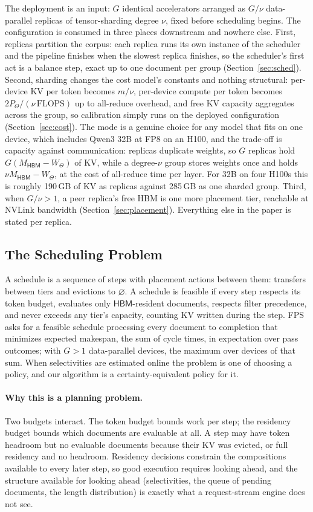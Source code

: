 \documentclass[10pt,twocolumn]{article}
\newcommand{\hbm}{\mathsf{HBM}}
\newcommand{\none}{\varnothing}
\begin{document}
The deployment is an input: $G$ identical accelerators arranged as $G/\nu$ data-parallel replicas of tensor-sharding degree $\nu$, fixed before scheduling begins. The configuration is consumed in three places downstream and nowhere else. First, replicas partition the corpus: each replica runs its own instance of the scheduler and the pipeline finishes when the slowest replica finishes, so the scheduler's first act is a balance step, exact up to one document per group (Section~\ref{sec:sched}). Second, sharding changes the cost model's constants and nothing structural: per-device KV per token becomes $m/\nu$, per-device compute per token becomes $2P_{\Theta}/(\nu\,\mathrm{FLOPS})$ up to all-reduce overhead, and free KV capacity aggregates across the group, so calibration simply runs on the deployed configuration (Section~\ref{sec:cost}). The mode is a genuine choice for any model that fits on one device, which includes Qwen3 32B at FP8 on an H100, and the trade-off is capacity against communication: replicas duplicate weights, so $G$ replicas hold $G(M_{\hbm} - W_{\Theta})$ of KV, while a degree-$\nu$ group stores weights once and holds $\nu M_{\hbm} - W_{\Theta}$, at the cost of all-reduce time per layer. For 32B on four H100s this is roughly 190\,GB of KV as replicas against 285\,GB as one sharded group. Third, when $G/\nu > 1$, a peer replica's free HBM is one more placement tier, reachable at NVLink bandwidth (Section~\ref{sec:placement}). Everything else in the paper is stated per replica.

\subsection{The Scheduling Problem}

A schedule is a sequence of steps with placement actions between them: transfers between tiers and evictions to $\none$. A schedule is feasible if every step respects its token budget, evaluates only $\hbm$-resident documents, respects filter precedence, and never exceeds any tier's capacity, counting KV written during the step. FPS asks for a feasible schedule processing every document to completion that minimizes expected makespan, the sum of cycle times, in expectation over pass outcomes; with $G > 1$ data-parallel devices, the maximum over devices of that sum. When selectivities are estimated online the problem is one of choosing a policy, and our algorithm is a certainty-equivalent policy for it.

\paragraph{Why this is a planning problem.} Two budgets interact. The token budget bounds work per step; the residency budget bounds which documents are evaluable at all. A step may have token headroom but no evaluable documents because their KV was evicted, or full residency and no headroom. Residency decisions constrain the compositions available to every later step, so good execution requires looking ahead, and the structure available for looking ahead (selectivities, the queue of pending documents, the length distribution) is exactly what a request-stream engine does not see.
\end{document}
